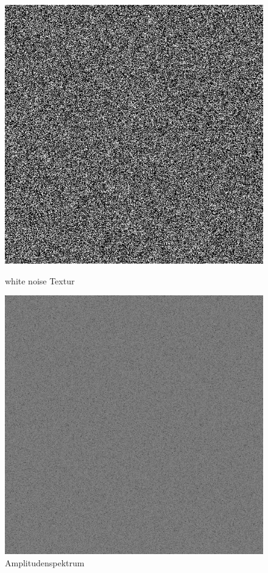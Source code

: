 \label{pic:white noise}
\begin{figure}[H]
    \centering
    \begin{minipage}[t]{0.45\linewidth}
        \centering
        \includegraphics[width=\linewidth]{content/BlueNoise/Bilder/whitenoise.png}
        \caption{white noise Textur}
    \end{minipage}
    \hfill
    \begin{minipage}[t]{0.45\linewidth}
        \centering
        \includegraphics[width=\linewidth]{content/BlueNoise/Bilder/FFT_whitenoise.png}
        \caption{Amplitudenspektrum}
        \label{pic:FrequenzspektrumWhiteNoise}
    \end{minipage}
\end{figure}

